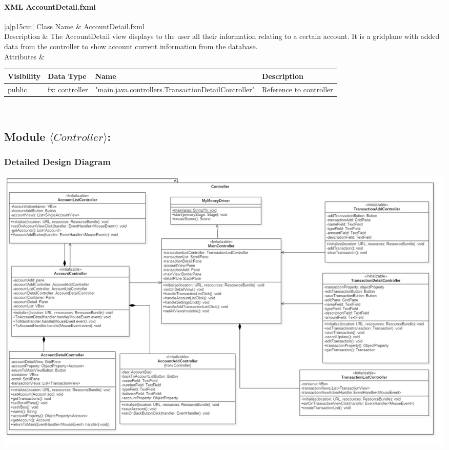 \documentclass[12pt]{article}
\begin{document}
\paragraph{XML AccountDetail.fxml}

\begin{table}[H]
	\begin{tabular}{|a|p{15cm}|}
		\hline
		{Class Name} & {AccountDetail.fxml} \\
		\hline
		Description & The AccountDetail view displays to the user all their information relating to a certain account. It is a gridplane with added data from the controller to show account current information from the database.\\
		\hline
		Attributes & 
		\begin{tabular}{| p{2cm} | p{3.5cm} | p{1.5cm} | p{6.45cm} |}
			\hline
			\rowcolor{lightgray}
			Visibility & Data Type & Name & Description \\	\hline
			\rowcolor{white}
			public & fx: controller & "main.java.controllers.TransactionDetailController" & Reference to controller\\
		\end{tabular} \\
		\hline							 
	\end{tabular}
\end{table}



\subsection{Module $\langle Controller\rangle$:}

\subsubsection{Detailed Design Diagram}

\includegraphics[width=\graphicwidth]{images/controler.png}
\end{document}
